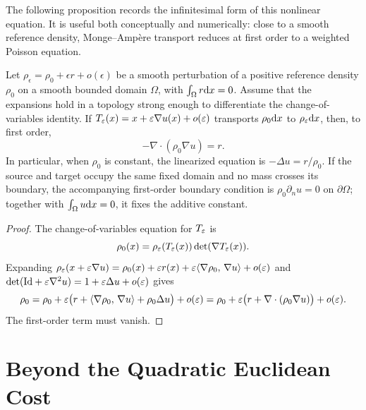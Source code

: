 The following proposition records the infinitesimal form of this nonlinear equation. It is useful both conceptually and numerically: close to a smooth reference density, Monge--Amp\`ere transport reduces at first order to a weighted Poisson equation.

\begin{prop}\label{prop-linearized-monge-ampere}
	Let $\rho_\epsilon=\rho_0+\epsilon r+o(\epsilon)$ be a smooth perturbation of a positive reference density $\rho_0$ on a smooth bounded domain $\Omega$, with $\int_\Omega r\mathrm{d} x=0$. Assume that the expansions hold in a topology strong enough to differentiate the change-of-variables identity. If $T_\varepsilon(x)=x+\varepsilon\nabla u(x)+o(\varepsilon)$ transports $\rho_0\mathrm{d} x$ to $\rho_\varepsilon\mathrm{d} x$, then, to first order,
	\[
		-\nabla\cdot(\rho_0\nabla u)=r.
	\]
	In particular, when $\rho_0$ is constant, the linearized equation is $-\Delta u=r/\rho_0$. If the source and target occupy the same fixed domain and no mass crosses its boundary, the accompanying first-order boundary condition is $\rho_0\partial_n u=0$ on $\partial\Omega$; together with $\int_\Omega u\mathrm{d} x=0$, it fixes the additive constant.
\end{prop}
\begin{proof}
	The change-of-variables equation for $T_\varepsilon$ is
	\[
		\rho_0(x)=\rho_\varepsilon(T_\varepsilon(x))\det(\nabla T_\varepsilon(x)).
	\]
	Expanding $\rho_\varepsilon(x+\varepsilon\nabla u)=\rho_0(x)+\varepsilon r(x)+\varepsilon\langle \nabla\rho_0,\,\nabla u\rangle+o(\varepsilon)$ and
	$\det(\mathrm{Id}+\varepsilon\nabla^2u)=1+\varepsilon\Delta u+o(\varepsilon)$ gives
	\[
		\rho_0
		=
		\rho_0+
		\varepsilon\bigl(r+\langle \nabla\rho_0,\,\nabla u\rangle+\rho_0\Delta u\bigr)+o(\varepsilon)
		=
		\rho_0+
		\varepsilon\bigl(r+\nabla\cdot(\rho_0\nabla u)\bigr)+o(\varepsilon).
	\]
	The first-order term must vanish.
\end{proof}


\section{Beyond the Quadratic Euclidean Cost}
\label{sec-beyond-quadratic-euclidean-cost}

